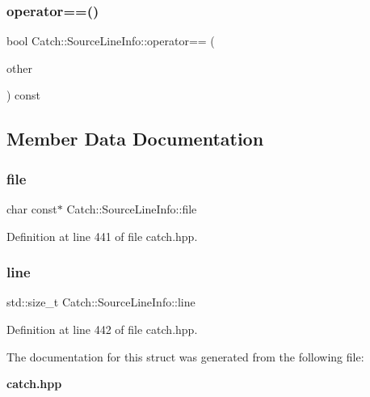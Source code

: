 \mbox{\label{struct_catch_1_1_source_line_info_af07e4fdeddf8409b91e4f842f6264cf8}} 
\subsubsection{operator==()}
{\footnotesize\ttfamily bool Catch\+::\+Source\+Line\+Info\+::operator== (\begin{DoxyParamCaption}\item[{\textbf{ Source\+Line\+Info} const \&}]{other }\end{DoxyParamCaption}) const\hspace{0.3cm}{\ttfamily [noexcept]}}



\subsection{Member Data Documentation}
\mbox{\label{struct_catch_1_1_source_line_info_ad65537703e9f08c1fa7777fbc3f0c617}} 
\subsubsection{file}
{\footnotesize\ttfamily char const$\ast$ Catch\+::\+Source\+Line\+Info\+::file}



Definition at line 441 of file catch.\+hpp.

\mbox{\label{struct_catch_1_1_source_line_info_a841e5d696c7b9cde24e45e61dd979c77}} 
\subsubsection{line}
{\footnotesize\ttfamily std\+::size\+\_\+t Catch\+::\+Source\+Line\+Info\+::line}



Definition at line 442 of file catch.\+hpp.



The documentation for this struct was generated from the following file\+:\begin{DoxyCompactItemize}
\item 
\textbf{ catch.\+hpp}\end{DoxyCompactItemize}
